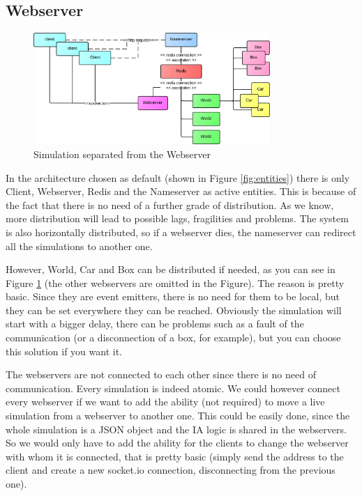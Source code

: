 \subsection{Webserver}

\begin{figure}[H]
\centering %
\includegraphics[width=0.8\textwidth]{./img/SystemAnalysis/EntitiesWebserver4everAlone.png}
\caption{Simulation separated from the Webserver}
\label{fig:entitiesWebserver4everAlone}
\end{figure}

In the architecture chosen as default (shown in Figure \ref{fig:entities}) there is only Client, Webserver, Redis and the Nameserver as active entities. This is because of the fact that there is no need of a further grade of distribution. As we know, more distribution will lead to possible lags, fragilities and problems. The system is also horizontally distributed, so if a webserver dies, the nameserver can redirect all the simulations to another one.

However, World, Car and Box can be distributed if needed, as you can see in Figure \ref{fig:entitiesWebserver4everAlone} (the other webservers are omitted in the Figure). The reason is pretty basic. Since they are event emitters, there is no need for them to be local, but they can be set everywhere they can be reached. Obviously the simulation will start with a bigger delay, there can be problems such as a fault of the communication (or a disconnection of a box, for example), but you can choose this solution if you want it.

The webservers are not connected to each other since there is no need of communication. Every simulation is indeed atomic. We could however connect every webserver if we want to add the ability (not required) to move a live simulation from a webserver to another one. This could be easily done, since the whole simulation is a JSON object and the IA logic is shared in the webservers. So we would only have to add the ability for the clients to change the webserver with whom it is connected, that is pretty basic (simply send the address to the client and create a new socket.io connection, disconnecting from the previous one).

